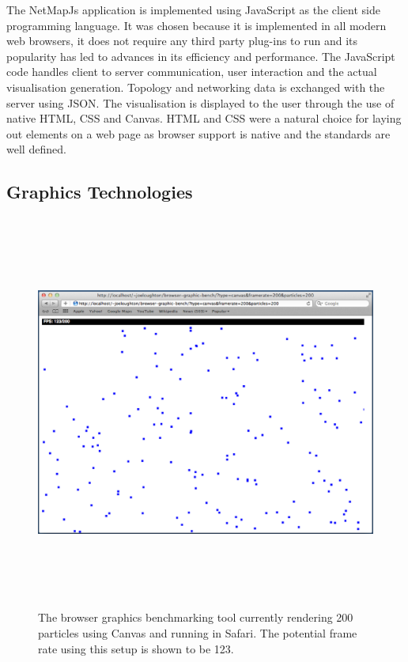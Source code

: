 \documentclass[11pt, a4paper]{report}
\begin{document}
The NetMapJs application is implemented using JavaScript as the client side
programming language. It was chosen because it is implemented in all modern web
browsers, it does not require any third party plug-ins to run and its popularity
has led to advances in its efficiency and performance. The JavaScript code
handles client to server communication, user interaction and the actual
visualisation generation. Topology and networking data is exchanged with the
server using JSON. The visualisation is displayed to the user through the use of
native HTML, CSS and Canvas. HTML and CSS were a natural choice for laying out
elements on a web page as browser support is native and the standards are well
defined.


\subsection{Graphics Technologies}

\begin{figure}
\centering
\includegraphics[width=170mm,height=130.08mm]{assets/benchmark-tool.eps}
\caption{The browser graphics benchmarking tool currently rendering 200
particles using Canvas and running in Safari. The potential frame rate using
this setup is shown to be 123.}
\label{fig:benchmark-tool}
\end{figure}
\end{document}
